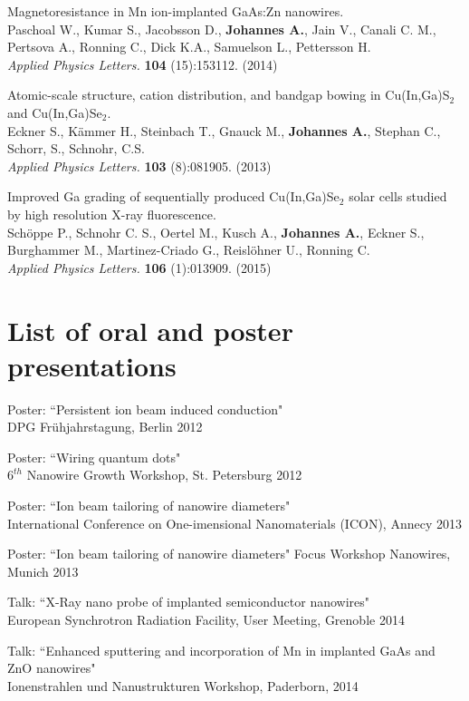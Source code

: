 \begin{appendices}
Magnetoresistance in Mn ion-implanted GaAs:Zn nanowires.\\
Paschoal W., Kumar S., Jacobsson D., \textbf{Johannes A.}, Jain V., Canali C. M., Pertsova A., Ronning C., Dick K.A., Samuelson L., Pettersson H. \\
\emph{Applied Physics Letters.} \textbf{104} (15):153112. (2014)

Atomic-scale structure, cation distribution, and bandgap bowing in Cu(In,Ga)S$_2$ and Cu(In,Ga)Se$_2$. \\
Eckner S., Kämmer H., Steinbach T., Gnauck M., \textbf{Johannes A.}, Stephan C., Schorr, S., Schnohr, C.S. \\
\emph{Applied Physics Letters.} \textbf{103} (8):081905. (2013) 

Improved Ga grading of sequentially produced Cu(In,Ga)Se$_2$ solar cells studied by high resolution X-ray fluorescence.\\
Schöppe P., Schnohr C. S., Oertel M., Kusch A., \textbf{Johannes A.}, Eckner S., Burghammer M., Martinez-Criado G., Reislöhner U., Ronning C.\\
\emph{Applied Physics Letters.} \textbf{106} (1):013909. (2015) 

\chapter{List of oral and poster presentations}

\setlength{\parskip}{1em}

Poster: ``Persistent ion beam induced conduction"\\
DPG Frühjahrstagung, Berlin 2012

Poster: ``Wiring quantum dots"\\
$6^{th}$ Nanowire Growth Workshop, St. Petersburg 2012

Poster: ``Ion beam tailoring of nanowire diameters"\\
International Conference on One-imensional Nanomaterials (ICON), Annecy 2013

Poster: ``Ion beam tailoring of nanowire diameters"
Focus Workshop Nanowires, Munich 2013

Talk: ``X-Ray nano probe of implanted semiconductor nanowires"\\
European Synchrotron Radiation Facility, User Meeting, Grenoble 2014

Talk: ``Enhanced sputtering and incorporation of Mn in implanted GaAs and ZnO nanowires"\\
Ionenstrahlen und Nanustrukturen Workshop, Paderborn, 2014


\end{appendices}
